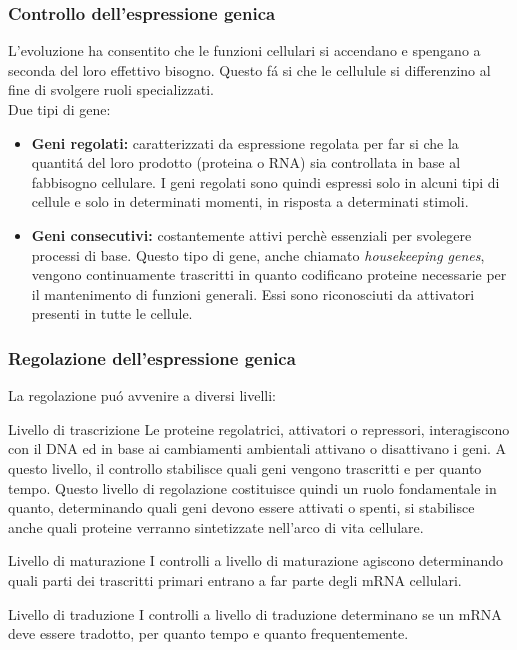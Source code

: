 \documentclass[hyperref={pdfpagelabels=false}]{beamer}
\begin{document}
\begin{frame}\frametitle{Controllo dell'espressione genica}
L'evoluzione ha consentito che le funzioni cellulari si accendano e spengano a seconda del loro effettivo bisogno. Questo f\'a si che le cellulule si differenzino al fine di svolgere ruoli specializzati.
\\
Due tipi di gene:
\begin{itemize}
\item \textbf{Geni regolati:}  caratterizzati da espressione regolata per far si che la quantit\'a del loro prodotto (proteina o RNA) sia controllata in base al fabbisogno cellulare. I geni regolati sono quindi espressi solo in alcuni tipi di cellule e solo in determinati momenti, in risposta a determinati stimoli.
\item \textbf{Geni consecutivi:} costantemente attivi perchè essenziali per svolegere processi di base. Questo tipo di gene, anche chiamato \emph{housekeeping genes}, vengono continuamente trascritti in quanto codificano proteine necessarie per il mantenimento di funzioni generali. Essi sono riconosciuti da attivatori  presenti in tutte le 
cellule.
\end{itemize}
\end{frame}
\begin{frame}\frametitle{Regolazione dell'espressione genica}
La regolazione pu\'o avvenire a diversi livelli:
\begin{block}{Livello di trascrizione}
Le proteine regolatrici, attivatori o repressori, interagiscono con il DNA ed in base ai cambiamenti ambientali attivano o disattivano i geni. A questo livello, il controllo stabilisce quali geni vengono trascritti e per quanto tempo. Questo livello di regolazione costituisce quindi un ruolo fondamentale in quanto, determinando quali geni devono essere attivati o spenti, si stabilisce anche quali proteine verranno sintetizzate nell'arco di vita cellulare.
\end{block}
\begin{block}{Livello di maturazione}
I controlli a livello di maturazione agiscono determinando quali parti dei trascritti primari entrano a far parte degli mRNA cellulari.
\end{block}
\begin{block}{Livello di traduzione}
I controlli a livello di traduzione determinano se un mRNA deve essere tradotto, per quanto tempo e quanto frequentemente.
\end{block}
\end{frame}
\end{document}
